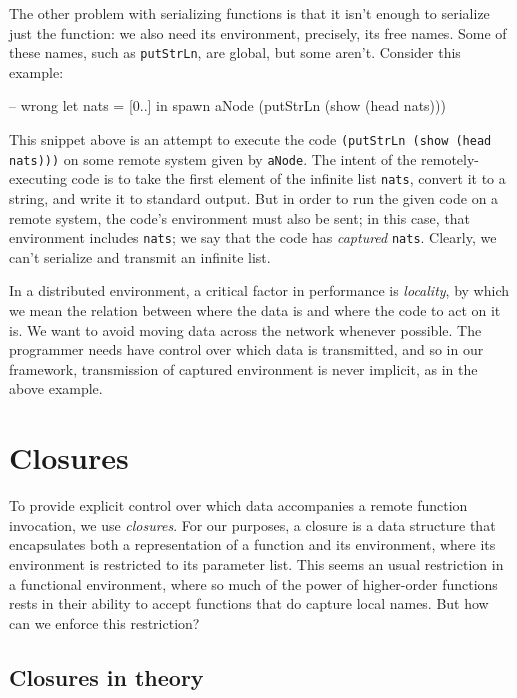 \documentclass[preprint]{sigplanconf}
\begin{document}
The other problem with serializing functions is that it isn't enough to serialize just the function: we also need its environment, precisely, its free names. Some of these names, such as \texttt{putStrLn}, are global, but some aren't. Consider this example:

\begin{code}
-- wrong
let nats = [0..]
 in spawn aNode (putStrLn (show (head nats))) 
\end{code}

This snippet above is an attempt to execute the code \lstinline!(putStrLn (show (head nats)))! on some remote system given by \texttt{aNode}. The intent of the remotely-executing code is to take the first element of the infinite list \texttt{nats}, convert it to a string, and write it to standard output. But in order to run the given code on a remote system, the code's environment must also be sent; in this case, that environment includes \texttt{nats}; we say that the code has {\em captured} \texttt{nats}. Clearly, we can't serialize and transmit an infinite list.

In a distributed environment, a critical factor in performance is {\em locality}, by which we mean the relation between where the data is and where the code to act on it is. We want to avoid moving data across the network whenever possible. The programmer needs have control over which data is transmitted, and so in our framework, transmission of captured environment is never implicit, as in the above example.


\section{Closures}

To provide explicit control over which data accompanies a remote function invocation, we use {\em closures}. For our purposes, a closure is a data structure that encapsulates both a representation of a function and its environment, where its environment is restricted to its parameter list. This seems an usual restriction in a functional environment, where so much of the power of higher-order functions rests in their ability to accept functions that do capture local names. But how can we enforce this restriction? 

\subsection{Closures in theory}
\end{document}
